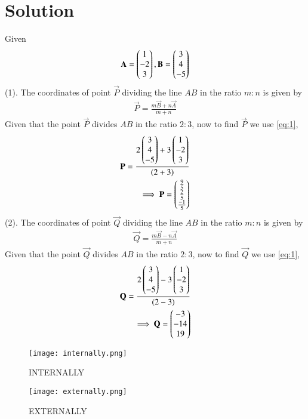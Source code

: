 \documentclass[journal,12pt,twocolumn]{IEEEtran}
\begin{document}
\section{Solution}
Given 
\begin{align}
  \mathbf{A} = \begin{pmatrix}1 \\ -2 \\ 3\end{pmatrix}, \mathbf{B}=\begin{pmatrix}3 \\ 4\\ -5\end{pmatrix} \label{eq:1}
\end{align}
(1). The coordinates of point $\vec{P}$ dividing the line $AB$ in the ratio $m:n$ is given by 
\begin{align}
\vec{P} = \frac{m\vec{B}+n\vec{A}}{m+n}  \label{2.0.2}
\end{align}
Given that the point $\vec{P}$ divides $AB$ in the ratio $2:3$, now to find $\vec{P}$ we use \eqref{eq:1},
\begin{align}
\mathbf{P}=\frac{2\begin{pmatrix}3\\4\\-5\end{pmatrix}+3\begin{pmatrix}1\\-2\\3\end{pmatrix}}
{(2+3)}
\\
\implies\mathbf{P}=\begin{pmatrix}{\frac{9}{5}} \\ {\frac{2}{5}} \\ {\frac{-1}{5}}\end{pmatrix}
\end{align}
(2). The coordinates of point $\vec{Q}$ dividing the line $AB$ in the ratio $m:n$ is given by 
\begin{align}
 \vec{Q} = \frac{m\vec{B}-n\vec{A}}{m+n}  \label{2.0.5}
\end{align}
Given that the point $\vec{Q}$ divides $AB$ in the ratio $2:3$, now to find $\vec{Q}$ we use \eqref{eq:1},
\begin{align}
\mathbf{Q}=\frac{2\begin{pmatrix}3\\4\\-5\end{pmatrix}-3\begin{pmatrix}1\\-2\\3\end{pmatrix}}
{(2-3)}
\\
\implies\mathbf{Q}=\begin{pmatrix}-3\\-14\\19\end{pmatrix}
\end{align}

\begin{figure}[!ht]
    \centering
\texttt{[image: internally.png]}
    \caption{INTERNALLY}
    \label{fig:Internally.}
\end{figure} 
\begin{figure}[!ht]
    \centering
\texttt{[image: externally.png]}
    \caption{EXTERNALLY}
    \label{fig:EXTERNALLY.}
\end{figure}  
\end{document}
